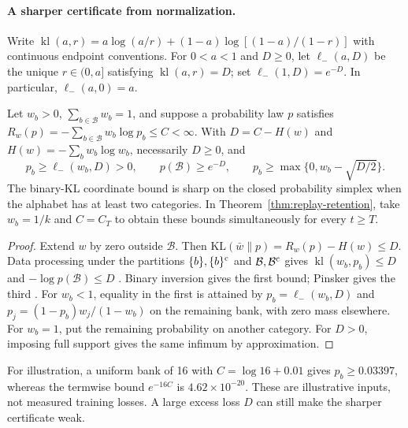\paragraph{A sharper certificate from normalization.}
Write $\operatorname{kl}(a,r)=a\log(a/r)+(1-a)\log[(1-a)/(1-r)]$
with continuous endpoint conventions. For $0<a<1$ and $D\ge0$, let
$\ell_-(a,D)$ be the unique $r\in(0,a]$ satisfying
$\operatorname{kl}(a,r)=D$; set $\ell_-(1,D)=e^{-D}$.
In particular, $\ell_-(a,0)=a$.

\begin{corollary}
\label{cor:replay-sharp-kl-certificate}
Let $w_b>0$, $\sum_{b\in\mathcal B}w_b=1$, and suppose a probability law
$p$ satisfies $R_w(p)=-\sum_{b\in\mathcal B}w_b\log p_b\le C<\infty$.
With $D=C-H(w)$ and $H(w)=-\sum_bw_b\log w_b$, necessarily $D\ge0$, and
\begin{equation}
 p_b\ge\ell_-(w_b,D)>0,\qquad
 p(\mathcal B)\ge e^{-D},\qquad
 p_b\ge\max\{0,w_b-\sqrt{D/2}\}.
 \label{eq:replay-sharp-kl-certificate}
\end{equation}
The binary-KL coordinate bound is sharp on the closed probability simplex
when the alphabet has at least two categories. In
Theorem~\ref{thm:replay-retention}, take $w_b=1/k$ and $C=C_T$ to obtain
these bounds simultaneously for every $t\ge T$.
\end{corollary}
\begin{proof}
Extend $w$ by zero outside $\mathcal B$. Then
$\mathrm{KL}(\bar w\|p)=R_w(p)-H(w)\le D$.
Data processing under the partitions $\{b\},\{b\}^{\rm c}$ and
$\mathcal B,\mathcal B^{\rm c}$ gives
$\operatorname{kl}(w_b,p_b)\le D$ and $-\log p(\mathcal B)\le D$
\citep[Theorem~9]{vanerven2014renyi}. Binary inversion gives the first
bound; Pinsker gives the third \citep[Theorem~31]{vanerven2014renyi}.
For $w_b<1$, equality in the first is attained by
$p_b=\ell_-(w_b,D)$ and
$p_j=(1-p_b)w_j/(1-w_b)$ on the remaining bank, with zero mass elsewhere.
For $w_b=1$, put the remaining probability on another category.
For $D>0$, imposing full support gives the same infimum by approximation.
\end{proof}

For illustration, a uniform bank of 16 with $C=\log16+0.01$ gives
$p_b\ge0.03397$, whereas the termwise bound $e^{-16C}$ is
$4.62\times10^{-20}$. These are illustrative inputs, not measured training
losses. A large excess loss $D$ can still make the sharper certificate weak.
